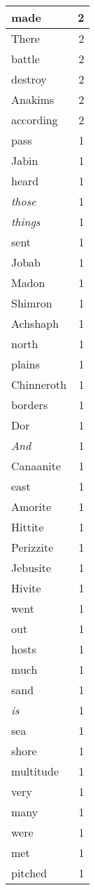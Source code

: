 \begin{center}
\begin{longtable}{l|r}
made & 2 \\ \hline
There & 2 \\ \hline
battle & 2 \\ \hline
destroy & 2 \\ \hline
Anakims & 2 \\ \hline
according & 2 \\ \hline
pass & 1 \\ \hline
Jabin & 1 \\ \hline
heard & 1 \\ \hline
\emph{those} & 1 \\ \hline
\emph{things} & 1 \\ \hline
sent & 1 \\ \hline
Jobab & 1 \\ \hline
Madon & 1 \\ \hline
Shimron & 1 \\ \hline
Achshaph & 1 \\ \hline
north & 1 \\ \hline
plains & 1 \\ \hline
Chinneroth & 1 \\ \hline
borders & 1 \\ \hline
Dor & 1 \\ \hline
\emph{And} & 1 \\ \hline
Canaanite & 1 \\ \hline
east & 1 \\ \hline
Amorite & 1 \\ \hline
Hittite & 1 \\ \hline
Perizzite & 1 \\ \hline
Jebusite & 1 \\ \hline
Hivite & 1 \\ \hline
went & 1 \\ \hline
out & 1 \\ \hline
hosts & 1 \\ \hline
much & 1 \\ \hline
sand & 1 \\ \hline
\emph{is} & 1 \\ \hline
sea & 1 \\ \hline
shore & 1 \\ \hline
multitude & 1 \\ \hline
very & 1 \\ \hline
many & 1 \\ \hline
were & 1 \\ \hline
met & 1 \\ \hline
pitched & 1 \\ \hline

\end{longtable}
\end{center}
